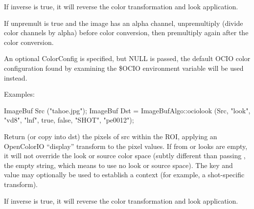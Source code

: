 If {\cf inverse} is {\cf true}, it will reverse the color transformation
and look application.

If {\cf unpremult} is {\cf true} and the image has an alpha channel,
unpremultiply (divide color channels by alpha) before color conversion, then
premultiply again after the color conversion.

An optional {\cf ColorConfig} is specified, but {\cf NULL} is passed, the
default OCIO color configuration found by examining the {\cf \$OCIO}
environment variable will be used instead.

\smallskip
\noindent Examples:
\begin{code}
    ImageBuf Src ("tahoe.jpg");
    ImageBuf Dst = ImageBufAlgo::ociolook (Src, "look", "vd8", "lnf",
                                           true, false, "SHOT", "pe0012");
\end{code}
\apiend


 
Return (or copy into {\cf dst}) the pixels of {\cf src} within the ROI,
applying an OpenColorIO ``display'' transform to the pixel values.
If {\cf from} or {\cf looks} are empty, it will not
override the look or source color space (subtly different than
passing \qkw{}, the empty string, which means to use no look or source
space).  The {\cf key} and {\cf value} may optionally be used
to establish a context (for example, a shot-specific transform).

If {\cf inverse} is {\cf true}, it will reverse the color transformation
and look application.

